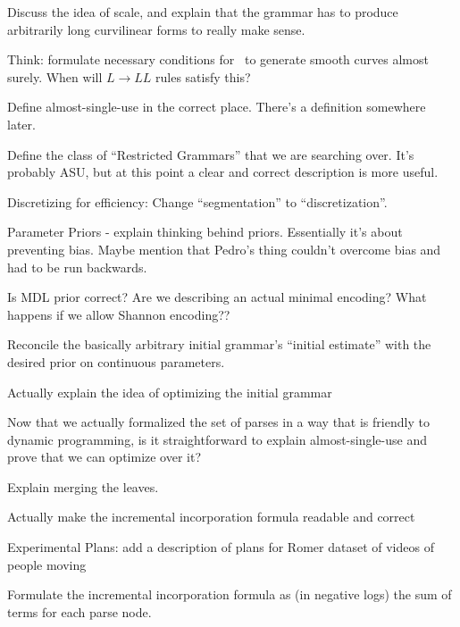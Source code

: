 \documentclass{article}
\begin{document}
\item Discuss the idea of scale, and explain that the grammar has to
  produce arbitrarily long curvilinear forms to really make sense.
\item Think: formulate necessary conditions for \GGG\ to generate
  smooth curves almost surely. When will $L \to LL$ rules satisfy this?
\item Define almost-single-use in the correct place. There's a definition somewhere later.
\item  Define the class of ``Restricted Grammars'' that we are searching over. It's probably ASU, but at this point a clear and correct description is more useful.
\item Discretizing for efficiency: Change ``segmentation'' to ``discretization''.
\item Parameter Priors - explain thinking behind priors. Essentially
  it's about preventing bias. Maybe mention that Pedro's thing
  couldn't overcome bias and had to be run backwards.
\item Is MDL prior correct? Are we describing an actual minimal encoding? What happens if we allow Shannon encoding??
\item Reconcile the basically arbitrary initial grammar's ``initial
  estimate'' with the desired prior on continuous parameters.
\item Actually explain the idea of optimizing the initial grammar
\item Now that we actually formalized the set of parses in a way that
  is friendly to dynamic programming, is it straightforward to explain
  almost-single-use and prove that we can optimize over it?
\item Explain merging the leaves.
\item Actually make the incremental incorporation formula readable and correct
\item Experimental Plans: add a description of plans for Romer dataset of videos of people moving
\item Formulate the incremental incorporation formula as (in negative logs) the sum of terms for each parse node.
\eitem
\end{document}
